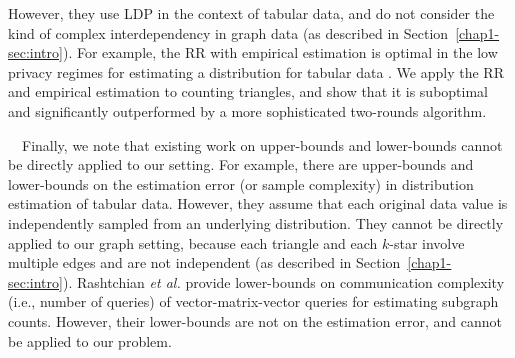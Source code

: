 However, they use LDP in the context of tabular data, and do not consider the kind of complex interdependency in graph data (as described in Section~\ref{chap1-sec:intro}). 
For example, the RR with empirical estimation is optimal in the low privacy regimes for estimating a distribution for tabular data \cite{Kairouz_ICML16,Kairouz_JMLR16}. 
We apply the RR and empirical estimation to counting triangles, and show that it is suboptimal and significantly outperformed by a more sophisticated 
two-rounds 
algorithm. 

\smallskip
{}~~Finally, we note that existing work on upper-bounds and lower-bounds cannot be directly applied to our setting. 
For example, there are upper-bounds
\cite{Acharya_AISTATS19,Kairouz_ICML16,Kairouz_JMLR16,Ye_ISIT17,Joseph_ArXiv19,Joseph_ArXiv19_Gauss} and
lower-bounds
\cite{Acharya_arXiv20,Duchi_ArXiv14,Duchi_ArXiv17,Joseph_ArXiv19,Duchi_ArXiv19,
Joseph_ArXiv19_Gauss, Joseph_SODA20} on the estimation error (or sample complexity) in 
distribution estimation of tabular data. 
However, they assume that each original data value is independently sampled from an underlying distribution. 
They cannot be directly applied to our graph setting, because each triangle and each $k$-star involve multiple edges and are not independent (as described in Section~\ref{chap1-sec:intro}). 
Rashtchian \textit{et al.} \cite{Rashtchian_arXiv20} provide lower-bounds on communication complexity (i.e., number of queries) of vector-matrix-vector queries for estimating subgraph counts. 
However, their lower-bounds are not on the estimation error, and cannot be applied to our problem.

